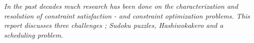 \documentclass{misc/theme}
\newcommand{\block}[1]{\vspace{1.2cm}\begin{changemargin}{2.5cm}{2.5cm}\large\textit{#1}\end{changemargin}\vspace{0.6cm}}
\newcommand{\fakesection}[1]{%
  \par\refstepcounter{section}%
  \sectionmark{#1}%
  \addcontentsline{toc}{section}{\protect\numberline{\thesection}#1}%
}
\begin{document}
\maketitle
\tableofcontents

%
%

\block{In the past decades much research has been done on the characterization and resolution of constraint satisfaction - and constraint optimization problems. This report discusses three challenges ; Sudoku puzzles, Hashiwokakero and a scheduling problem.}

%
% 



%
% 



%
% 



%
%

\newpage
\appendix

\end{document}
